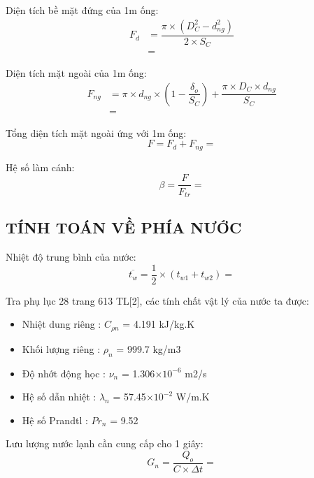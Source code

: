 Diện tích bề mặt đứng của 1m ống:
\begin{equation*}
	\begin{split}
		F_{d} &= \dfrac{\pi\times(D_{C}^2 - d_{ng}^2)}{2\times S_{C}}\\
		&= 
	\end{split}
\end{equation*}

Diện tích mặt ngoài của 1m ống:
\begin{equation*}
	\begin{split}
		F_{ng} &= \pi\times d_{ng}\times\left(1 - \dfrac{\delta_{o}}{S_{C}}\right) + \dfrac{\pi\times D_{C}\times d_{ng}}{S_{C}} \\
		&= 
	\end{split}
\end{equation*}

Tổng diện tích mặt ngoài ứng với 1m ống:
\begin{equation*}
	F = F_{d} + F_{ng} = 
\end{equation*}

Hệ số làm cánh:
\begin{equation*}
	\beta = \dfrac{F}{F_{tr}} =
\end{equation*}

\subsection{TÍNH TOÁN VỀ PHÍA NƯỚC}
Nhiệt độ trung bình của nước:
\begin{equation*}
	\overline{t_{w}} = \dfrac{1}{2}\times(t_{w1} + t_{w2}) = 
\end{equation*}

Tra phụ lục 28 trang 613 TL[2], các tính chất vật lý của nước ta được:
\begin{itemize}
	\item Nhiệt dung riêng : $C_{\rho n}$ = 4.191 kJ/kg.K
	\item Khối lượng riêng : $ \rho_{n} $ = 999.7 kg/m3
	\item Độ nhớt động học : $ \nu_{n} $ = 1.306$\times10^{-6}$ m2/s
	\item Hệ số dẫn nhiệt : $ \lambda_{n} $ = 57.45$\times10^{-2}$ W/m.K
	\item Hệ số Prandtl : $ Pr_{n} $ = 9.52
\end{itemize}

Lưu lượng nước lạnh cần cung cấp cho 1 giây:
\begin{equation*}
	G_{n} = \dfrac{Q_{o}}{C\times\Delta t} = 
\end{equation*}

